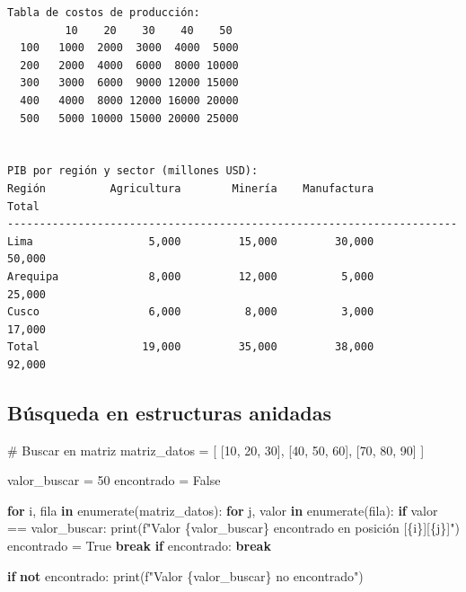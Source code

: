 \documentclass[
  doc,
  floatsintext,
  longtable,
  a4paper,
  nolmodern,
  notxfonts,
  notimes,
  12pt,
  colorlinks=true,linkcolor=blue,citecolor=blue,urlcolor=blue]{apa7}
\newenvironment{Shaded}{\begin{snugshade}}{\end{snugshade}}
\newcommand{\BuiltInTok}[1]{\textcolor[rgb]{0.00,0.23,0.31}{#1}}
\newcommand{\CommentTok}[1]{\textcolor[rgb]{0.37,0.37,0.37}{#1}}
\newcommand{\ControlFlowTok}[1]{\textcolor[rgb]{0.00,0.23,0.31}{\textbf{#1}}}
\newcommand{\DecValTok}[1]{\textcolor[rgb]{0.68,0.00,0.00}{#1}}
\newcommand{\KeywordTok}[1]{\textcolor[rgb]{0.00,0.23,0.31}{\textbf{#1}}}
\newcommand{\NormalTok}[1]{\textcolor[rgb]{0.00,0.23,0.31}{#1}}
\newcommand{\OperatorTok}[1]{\textcolor[rgb]{0.37,0.37,0.37}{#1}}
\newcommand{\SpecialCharTok}[1]{\textcolor[rgb]{0.37,0.37,0.37}{#1}}
\newcommand{\SpecialStringTok}[1]{\textcolor[rgb]{0.13,0.47,0.30}{#1}}
\newcommand{\VariableTok}[1]{\textcolor[rgb]{0.07,0.07,0.07}{#1}}
\begin{document}
\begin{verbatim}
Tabla de costos de producción:
         10    20    30    40    50
  100   1000  2000  3000  4000  5000
  200   2000  4000  6000  8000 10000
  300   3000  6000  9000 12000 15000
  400   4000  8000 12000 16000 20000
  500   5000 10000 15000 20000 25000


PIB por región y sector (millones USD):
Región          Agricultura        Minería    Manufactura          Total
----------------------------------------------------------------------
Lima                  5,000         15,000         30,000         50,000
Arequipa              8,000         12,000          5,000         25,000
Cusco                 6,000          8,000          3,000         17,000
Total                19,000         35,000         38,000         92,000
\end{verbatim}

\subsection{Búsqueda en estructuras
anidadas}\label{buxfasqueda-en-estructuras-anidadas}

\begin{Shaded}
\begin{Highlighting}[]
\CommentTok{\# Buscar en matriz}
\NormalTok{matriz\_datos }\OperatorTok{=}\NormalTok{ [}
\NormalTok{    [}\DecValTok{10}\NormalTok{, }\DecValTok{20}\NormalTok{, }\DecValTok{30}\NormalTok{],}
\NormalTok{    [}\DecValTok{40}\NormalTok{, }\DecValTok{50}\NormalTok{, }\DecValTok{60}\NormalTok{],}
\NormalTok{    [}\DecValTok{70}\NormalTok{, }\DecValTok{80}\NormalTok{, }\DecValTok{90}\NormalTok{]}
\NormalTok{]}

\NormalTok{valor\_buscar }\OperatorTok{=} \DecValTok{50}
\NormalTok{encontrado }\OperatorTok{=} \VariableTok{False}

\ControlFlowTok{for}\NormalTok{ i, fila }\KeywordTok{in} \BuiltInTok{enumerate}\NormalTok{(matriz\_datos):}
    \ControlFlowTok{for}\NormalTok{ j, valor }\KeywordTok{in} \BuiltInTok{enumerate}\NormalTok{(fila):}
        \ControlFlowTok{if}\NormalTok{ valor }\OperatorTok{==}\NormalTok{ valor\_buscar:}
            \BuiltInTok{print}\NormalTok{(}\SpecialStringTok{f"Valor }\SpecialCharTok{\{}\NormalTok{valor\_buscar}\SpecialCharTok{\}}\SpecialStringTok{ encontrado en posición [}\SpecialCharTok{\{}\NormalTok{i}\SpecialCharTok{\}}\SpecialStringTok{][}\SpecialCharTok{\{}\NormalTok{j}\SpecialCharTok{\}}\SpecialStringTok{]"}\NormalTok{)}
\NormalTok{            encontrado }\OperatorTok{=} \VariableTok{True}
            \ControlFlowTok{break}
    \ControlFlowTok{if}\NormalTok{ encontrado:}
        \ControlFlowTok{break}

\ControlFlowTok{if} \KeywordTok{not}\NormalTok{ encontrado:}
    \BuiltInTok{print}\NormalTok{(}\SpecialStringTok{f"Valor }\SpecialCharTok{\{}\NormalTok{valor\_buscar}\SpecialCharTok{\}}\SpecialStringTok{ no encontrado"}\NormalTok{)}
\end{Highlighting}
\end{Shaded}
\end{document}
